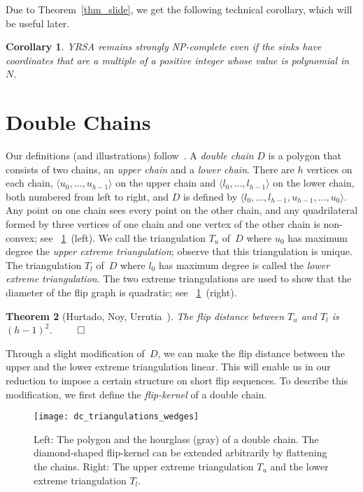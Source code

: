 \documentclass[a4paper,11pt]{article}
\newtheorem{theorem}{Theorem}[section]
\newtheorem{corollary}[theorem]{Corollary}
\newcommand{\noproof}{~\hfill$\qed$}
\begin{document}
Due to Theorem~\ref{thm_slide}, we get the following technical corollary, which will be useful later.

\begin{corollary}\label{cor_blow_up}
YRSA remains strongly NP-complete even if the sinks have coordinates that are a multiple of a positive integer whose value is polynomial in~$N$.
\end{corollary}

\section{Double Chains}\label{sec:double_chain}
Our definitions (and illustrations) follow~\cite{point_set_hard}.  A \emph{double
chain} $D$ is a polygon
that consists of two chains, an \emph{upper chain} and a \emph{lower chain}.
There are $h$ vertices on each chain, $\langle u_0, \dots, u_{h-1} \rangle$ on the
upper chain and $\langle l_0, \dots, l_{h-1} \rangle$ on the lower chain,
both numbered from left to right, and $D$ is defined by $\langle l_0, \dots, l_{h-1}, u_{h-1}, \dots, u_0 \rangle$.
Any point on one chain sees every point on the other chain, and any quadrilateral formed by three vertices of one chain and one vertex of the other chain is non-convex;
see \figurename~\ref{fig_dc_triangulations_wedges}~(left).
We call the triangulation $T_u$ of~$D$ where $u_0$ has maximum degree the
\emph{upper extreme triangulation}; observe that this triangulation is unique.  
The triangulation $T_l$ of~$D$ where $l_0$ has maximum degree
is called the \emph{lower extreme triangulation}.  The two extreme triangulations
are used to show that the diameter of the flip graph is quadratic; see \figurename~\ref{fig_dc_triangulations_wedges}~(right).

\begin{theorem}[Hurtado, Noy, Urrutia~\cite{hurtado_noy_urrutia}]\label{thm_dc}
The flip distance between $T_u$ and $T_l$ is~\mbox{$(h-1)^2$}.\noproof
\end{theorem}

Through a slight modification of~$D$, we can make the flip distance between the upper and the lower extreme triangulation linear.
This will enable us in our reduction to impose a certain structure on short flip sequences.
To describe this modification, we first define the \emph{flip-kernel} of a double chain.

\begin{figure}
\centering
\texttt{[image: dc\_triangulations\_wedges]}
\caption{
Left: The polygon and the hourglass (gray) of a double chain. The diamond-shaped
flip-kernel can be extended arbitrarily by flattening the chains.
Right: The upper extreme triangulation $T_u$ and the lower extreme triangulation $T_l$. 
}
\label{fig_dc_triangulations_wedges}
\end{figure}
\end{document}
